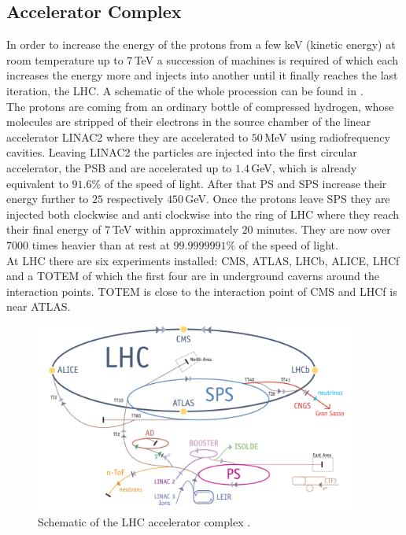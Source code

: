\documentclass[british,11pt,a4paper]{memoir}
\begin{document}
\subsection*{Accelerator Complex}
In order to increase the energy of the protons from a few keV (kinetic energy) at room temperature up to $7\,$TeV a succession of machines is required of which each increases the energy more and injects into another until it finally reaches the last iteration, the \ac{LHC}. A schematic of the whole procession can be found in .\\
The protons are coming from an ordinary bottle of compressed hydrogen, whose molecules are stripped of their electrons in the source chamber of the linear accelerator LINAC2 where they are accelerated to $50\,$MeV using radiofrequency cavities. Leaving LINAC2 the particles are injected into the first circular accelerator, the \ac{PSB} and are accelerated up to $1.4\,$GeV, which is already equivalent to $91.6\%$ of the speed of light. After that \ac{PS} and \ac{SPS} increase their energy further to $25$ respectively $450\,$GeV. Once the protons leave \ac{SPS} they are injected both clockwise and anti clockwise into the ring of \ac{LHC} where they reach their final energy of $7\,$TeV within approximately $20$ minutes. They are now over $7000$ times heavier than at rest at $99.9999991\%$ of the speed of light.\\
At \ac{LHC} there are six experiments installed: \ac{CMS}, \ac{ATLAS}, \ac{LHCb}, \ac{ALICE}, \ac{LHCf} and a \ac{TOTEM} of which the first four are in underground caverns around the interaction points. \ac{TOTEM} is close to the interaction point of \ac{CMS} and \ac{LHCf} is near \ac{ATLAS}.
\begin{figure}[ht]
	\includegraphics[width=0.95\textwidth]{lhc}
	\caption{Schematic of the \ac{LHC} accelerator complex \cite{lhc}.}
	\label{p18}
\end{figure}
\end{document}
